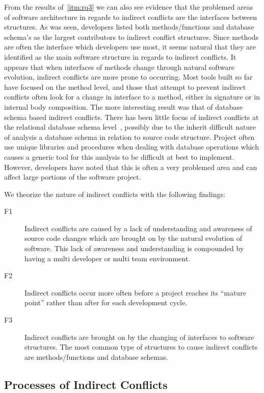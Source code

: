 \documentclass[conference]{IEEEtran}
\makeatletter
\def\namedlabel#1#2{\begingroup
   \def\@currentlabel{#2}%
   \label{#1}\endgroup
}
\makeatother
\begin{document}
From the results of~\ref{itm:rq3} we can also see evidence that the problemed areas of software architecture in regards to indirect conflicts are
the interfaces between structures. As was seen, developers listed both methods/functions and database schema's as the largest contributors
to indirect conflict structures. Since methods are often the interface which developers use most, it seems natural that they are identified
as the main software structure in regards to indirect conflicts. It appears that when interfaces of methods change through natural software
evolution, indirect conflicts are more prone to occurring.
Most tools built so far have focused on the method level, and those that attempt to prevent indirect conflicts often look for a change
in interface to a method, either in signature or in internal body composition. The more interesting result was that of database schema based 
indirect conflicts. There has been little focus of indirect conflicts at the relational database schema level~\cite{Maule:2008:IAD}, 
possibly due to the inherit difficult nature
of analysis a database schema in relation to source code structure. Project often use unique libraries and procedures when dealing with
database operations which causes a generic tool for this analysis to be difficult at best to implement. However, developers have noted that this
is often a very problemed area and can affect large portions of the software project. 

We theorize the nature of indirect conflicts with the following findings: 
\begin{description}
	\item[F1\namedlabel{itm:f1}{F1}] Indirect conflicts are caused by a lack of understanding and awareness of source code changes which are brought on
						by the natural evolution of software. This lack of awareness and understanding is compounded by having a multi developer
						or multi team environment.
	\item[F2\namedlabel{itm:f2}{F2}] Indirect conflicts occur more often before a project reaches its ``mature point'' rather than after for each development
						cycle.
	\item[F3\namedlabel{itm:f3}{F3}] Indirect conflicts are brought on by the changing of interfaces to software structures. The most common type of structures
						to cause indirect conflicts are methods/functions and database schemas.
\end{description}


\subsection{Processes of Indirect Conflicts}
\label{sec:pd}
\end{document}
